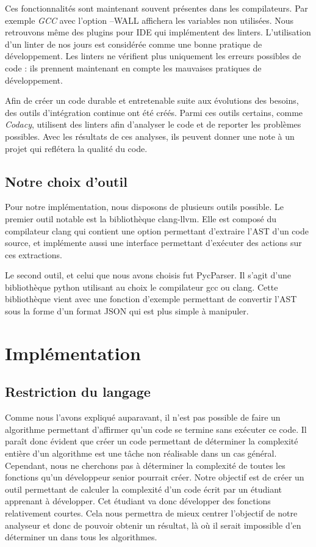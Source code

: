 \documentclass[12pt, twoside, openright]{report}
\begin{document}
Ces fonctionnalités sont maintenant souvent présentes dans les compilateurs. Par exemple \textit{GCC} avec l'option --WALL affichera les variables non utilisées. Nous retrouvons même des plugins pour IDE qui implémentent des linters. L'utilisation d'un linter de nos jours est considérée comme une bonne pratique de développement. Les linters ne vérifient plus uniquement les erreurs possibles de code : ils prennent maintenant en compte les mauvaises pratiques de développement.  

Afin de créer un code durable et entretenable suite aux évolutions des besoins, des outils d'intégration continue ont été créés. Parmi ces outils certains, comme \textit{Codacy}, utilisent des linters afin d'analyser le code et de reporter les problèmes possibles. Avec les résultats de ces analyses, ils peuvent donner une note à un projet qui reflétera la qualité du code.   

\section{Notre choix d'outil}

Pour notre implémentation, nous disposons de plusieurs outils possible. Le premier outil notable est la bibliothèque clang-llvm. Elle est composé du compilateur clang qui contient une option permettant d'extraire l'AST d'un code source, et implémente aussi une interface permettant d'exécuter des actions sur ces extractions. 

Le second outil, et celui que nous avons choisis fut PycParser. Il s'agit d'une bibliothèque python utilisant au choix le compilateur gcc ou clang. Cette bibliothèque vient avec une fonction d'exemple permettant de convertir l'AST sous la forme d'un format JSON qui est plus simple à manipuler.

\chapter{Implémentation}

\section{Restriction du langage}

Comme nous l'avons expliqué auparavant, il n'est pas possible de faire un algorithme permettant d'affirmer qu'un code se termine sans exécuter ce code. Il paraît donc évident que créer un code permettant de déterminer la complexité entière d'un algorithme est une tâche non réalisable dans un cas général. Cependant, nous ne cherchons pas à déterminer la complexité de toutes les fonctions qu'un développeur senior pourrait créer. Notre objectif est de créer un outil permettant de calculer la complexité d'un code écrit par un étudiant apprenant à développer. Cet étudiant va donc développer des fonctions relativement courtes. Cela nous permettra de mieux centrer l'objectif de notre analyseur et donc de pouvoir obtenir un résultat, là où il serait impossible d'en déterminer un dans tous les algorithmes.
\end{document}
